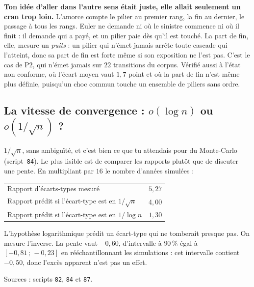 \documentclass[11pt,a4paper]{article}
\begin{document}
\textbf{Ton idée d'aller dans l'autre sens était juste, elle allait seulement un cran trop loin.}
L'amorce compte le pilier au premier rang, la fin au dernier, le passage à tous les rangs. Euler ne
demande ni où le sinistre commence ni où il finit : il demande qui a payé, et un pilier paie dès
qu'il est touché. La part de fin, elle, mesure un \emph{puits} : un pilier qui n'émet jamais arrête
toute cascade qui l'atteint, donc sa part de fin est forte même si son exposition ne l'est pas.
C'est le cas de P2, qui n'émet jamais sur $22$ transitions du corpus. Vérifié aussi à l'état non
conforme, où l'écart moyen vaut $1{,}7$ point et où la part de fin n'est même plus définie,
puisqu'un choc commun touche un ensemble de piliers sans ordre.

\subsection*{La vitesse de convergence : $o(\log n)$ ou $o(1/\sqrt{n})$ ?}

$1/\sqrt{n}$, sans ambiguïté, et c'est bien ce que tu attendais pour du Monte-Carlo
(script~\texttt{84}). Le plus lisible est de comparer les rapports plutôt que de discuter une
pente. En multipliant par $16$ le nombre d'années simulées :

\begin{center}
\begin{tabular}{@{}l r@{}}
\toprule
Rapport d'écarts-types mesuré & $5{,}27$ \\
Rapport prédit si l'écart-type est en $1/\sqrt{n}$ & $4{,}00$ \\
Rapport prédit si l'écart-type est en $1/\log n$ & $1{,}30$ \\
\bottomrule
\end{tabular}
\end{center}

L'hypothèse logarithmique prédit un écart-type qui ne tomberait presque pas. On mesure l'inverse.
La pente vaut $-0{,}60$, d'intervalle à $90\,\%$ égal à $[-0{,}81 \,;\, -0{,}23]$ en
rééchantillonnant les simulations : cet intervalle contient $-0{,}50$, donc l'excès apparent
n'est pas un effet.

\medskip
{\small Sources : scripts \texttt{82}, \texttt{84} et \texttt{87}.}
\end{document}
